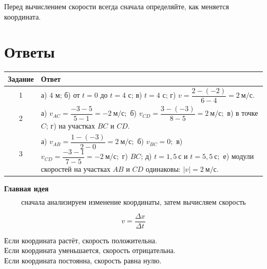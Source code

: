 \documentclass[a4paper,12pt]{article}
\begin{document}
\vfill

\begin{center}
\color{darkaccent}
\small
Перед вычислением скорости всегда сначала определяйте,
как меняется координата.
\end{center}

\clearpage
\section{Ответы}

\renewcommand{\arraystretch}{1.35}

\begin{center}
\begin{tabularx}{\linewidth}{@{}c X@{}}
\toprule
\textbf{Задание} & \textbf{Ответ} \\
\midrule

1 &
а) \(4\) м;
б) от \(t=0\) до \(t=4\) с;
в) \(t=4\) с;
г)
\(
v=\dfrac{2-(-2)}{6-4}=2~\text{м/с}.
\)
\\

\addlinespace

2 &
а)
\(
v_{AC}=\dfrac{-3-5}{5-1}=-2~\text{м/с};
\)
\newline
б)
\(
v_{CD}=\dfrac{3-(-3)}{8-5}=2~\text{м/с};
\)
\newline
в) в точке \(C\);
\newline
г) на участках \(BC\) и \(CD\).
\\

\addlinespace

3 &
а)
\(
v_{AB}=\dfrac{1-(-3)}{2-0}=2~\text{м/с};
\)
\newline
б)
\(
v_{BC}=0;
\)
\newline
в)
\(
v_{CD}=\dfrac{-3-1}{7-5}=-2~\text{м/с};
\)
\newline
г) \(BC\);
\newline
д)
\(
t=1{,}5~\text{с}
\)
и
\(
t=5{,}5~\text{с};
\)
\newline
е) модули скоростей на участках \(AB\) и \(CD\) одинаковы:
\(
|v|=2~\text{м/с}.
\)
\\

\bottomrule
\end{tabularx}
\end{center}

\vfill

\begin{center}
{\large\bfseries\color{darkaccent}
Главная идея}
\end{center}

\[
\boxed{
\text{сначала анализируем изменение координаты, затем вычисляем скорость}
}
\]

\[
\boxed{
v=\frac{\Delta x}{\Delta t}
}
\]

\begin{center}
\small
Если координата растёт, скорость положительна.\\
Если координата уменьшается, скорость отрицательна.\\
Если координата постоянна, скорость равна нулю.
\end{center}
\end{document}
